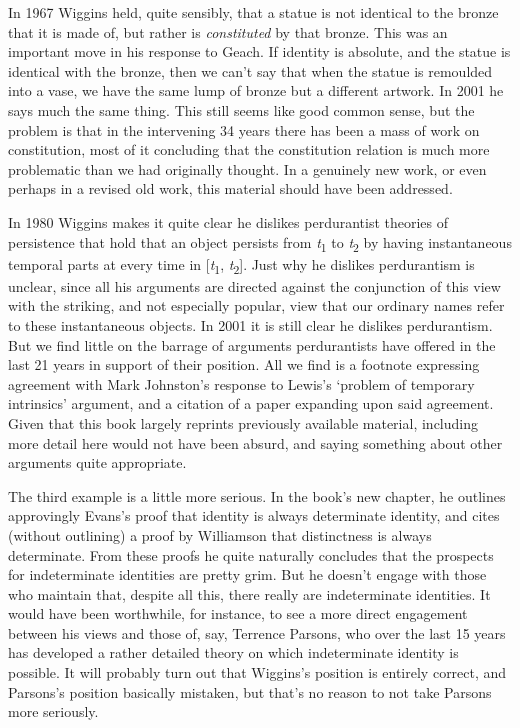 \documentclass[
  10pt,
  letterpaper,
  DIV=11,
  numbers=noendperiod,
  twoside]{scrartcl}
\begin{document}
In 1967 Wiggins held, quite sensibly, that a statue is not identical to
the bronze that it is made of, but rather is \emph{constituted} by that
bronze. This was an important move in his response to Geach. If identity
is absolute, and the statue is identical with the bronze, then we can't
say that when the statue is remoulded into a vase, we have the same lump
of bronze but a different artwork. In 2001 he says much the same thing.
This still seems like good common sense, but the problem is that in the
intervening 34 years there has been a mass of work on constitution, most
of it concluding that the constitution relation is much more problematic
than we had originally thought. In a genuinely new work, or even perhaps
in a revised old work, this material should have been addressed.

In 1980 Wiggins makes it quite clear he dislikes perdurantist theories
of persistence that hold that an object persists from
\emph{t}­\textsubscript{1} to \emph{t}\textsubscript{2} by having
instantaneous temporal parts at every time in
{[}\emph{t}\textsubscript{1}, \emph{t}\textsubscript{2}{]}. Just why he
dislikes perdurantism is unclear, since all his arguments are directed
against the conjunction of this view with the striking, and not
especially popular, view that our ordinary names refer to these
instantaneous objects. In 2001 it is still clear he dislikes
perdurantism. But we find little on the barrage of arguments
perdurantists have offered in the last 21 years in support of their
position. All we find is a footnote expressing agreement with Mark
Johnston's response to Lewis's `problem of temporary intrinsics'
argument, and a citation of a paper expanding upon said agreement. Given
that this book largely reprints previously available material, including
more detail here would not have been absurd, and saying something about
other arguments quite appropriate.

The third example is a little more serious. In the book's new chapter,
he outlines approvingly Evans's proof that identity is always
determinate identity, and cites (without outlining) a proof by
Williamson that distinctness is always determinate. From these proofs he
quite naturally concludes that the prospects for indeterminate
identities are pretty grim. But he doesn't engage with those who
maintain that, despite all this, there really are indeterminate
identities. It would have been worthwhile, for instance, to see a more
direct engagement between his views and those of, say, Terrence Parsons,
who over the last 15 years has developed a rather detailed theory on
which indeterminate identity is possible. It will probably turn out that
Wiggins's position is entirely correct, and Parsons's position basically
mistaken, but that's no reason to not take Parsons more seriously.
\end{document}
